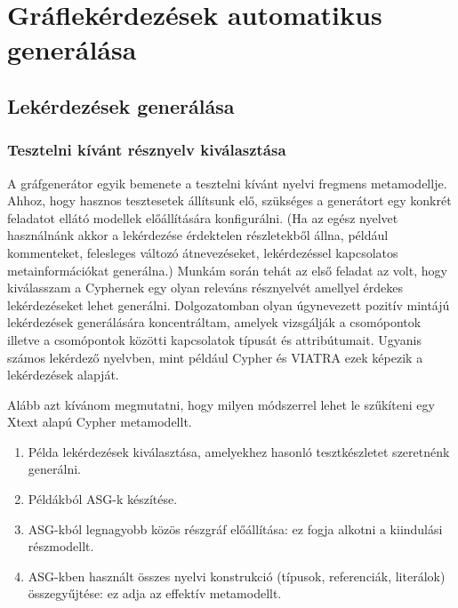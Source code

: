 \chapter{Gráflekérdezések automatikus generálása}
\section{Lekérdezések generálása}

\subsection{Tesztelni kívánt résznyelv kiválasztása}

A gráfgenerátor egyik bemenete a tesztelni kívánt nyelvi fregmens metamodellje. Ahhoz, hogy hasznos tesztesetek állítsunk elő, szükséges a generátort egy konkrét feladatot ellátó modellek előállítására konfigurálni. (Ha az egész nyelvet használnánk akkor a lekérdezése érdektelen részletekből állna, például kommenteket, felesleges változó átnevezéseket, lekérdezéssel kapcsolatos metainformációkat generálna.) Munkám során tehát az első feladat az volt, hogy kiválasszam a Cyphernek egy olyan releváns résznyelvét amellyel érdekes lekérdezéseket lehet generálni. Dolgozatomban olyan úgynevezett pozitív mintájú lekérdezések generálására koncentráltam, amelyek vizsgálják a csomópontok illetve a csomópontok közötti kapcsolatok típusát és attribútumait. Ugyanis számos lekérdező nyelvben, mint például Cypher \cite{Cypher} és \textsc{VIATRA} \cite{viatra} ezek képezik a lekérdezések alapját. 

%


Alább azt kívánom megmutatni, hogy milyen módszerrel lehet le szűkíteni egy Xtext alapú Cypher metamodellt. 

\begin{enumerate}
	\item  Példa lekérdezések kiválasztása, amelyekhez hasonló tesztkészletet szeretnénk generálni.
	\item  Példákból ASG-k készítése.
	\item  ASG-kból legnagyobb közös részgráf előállítása: ez fogja  alkotni a kiindulási részmodellt.
	\item  ASG-kben használt összes nyelvi konstrukció (típusok, referenciák, literálok) összegyűjtése: ez adja az effektív metamodellt.
\end{enumerate}   


